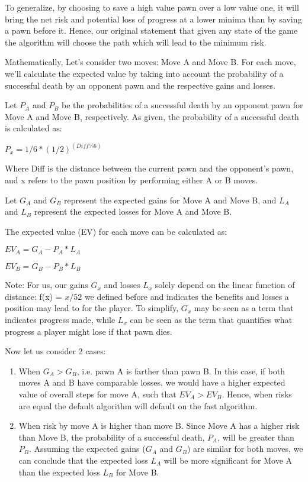 \documentclass{article} %
\begin{document}
To generalize, by choosing to save a high value pawn over a low value one, it will bring the net risk and potential loss of progress at a lower minima than by saving a pawn before it. Hence, our original statement that given any state of the game the algorithm will choose the path which will lead to the minimum risk.

Mathematically, Let's consider two moves: Move A and Move B. For each move, we'll calculate the expected value by taking into account the probability of a successful death by an opponent pawn and the respective gains and losses.

Let $P_A$ and $P_B$ be the probabilities of a successful death by an opponent pawn for Move A and Move B, respectively. As given, the probability of a successful death is calculated as:

$P_x = 1/6 * (1/2)^{(Diff\%6)}$

Where Diff is the distance between the current pawn and the opponent's pawn, and x refers to the pawn position by performing either A or B moves.

Let $G_A$ and $G_B$ represent the expected gains for Move A and Move B, and $L_A$ and $L_B$ represent the expected losses for Move A and Move B.

The expected value (EV) for each move can be calculated as:

$EV_A = G_A - P_A * L_A$

$EV_B = G_B - P_B * L_B$

Note: For us, our gains $G_x$ and losses $L_x$ solely depend on the linear function of distance: f(x) = $x/52$ we defined before and indicates the benefits and losses a position may lead to for the player. To simplify, $G_x$ may be seen as a term that indicates progress made, while $L_x$ can be seen as the term that quantifies what progress a player might lose if that pawn dies.

Now let us consider 2 cases:
\begin{enumerate}
    

\item When $G_A > G_B$, i.e. pawn A is farther than pawn B. In this case, if both moves A and B have comparable losses, we would have a higher expected value of overall steps for move A, such that $EV_A > EV_B$. Hence, when risks are equal the default algorithm will default on the fast algorithm.
\item When risk by move A is higher than move B. Since Move A has a higher risk than Move B, the probability of a successful death, $P_A$, will be greater than $P_B$. Assuming the expected gains ($G_A$ and $G_B$) are similar for both moves, we can conclude that the expected loss $L_A$ will be more significant for Move A than the expected loss $L_B$ for Move B.
\end{enumerate}
\end{document}
